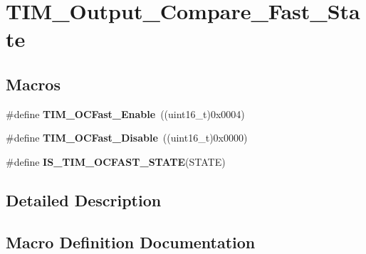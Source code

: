 \hypertarget{group___t_i_m___output___compare___fast___state}{}\section{T\+I\+M\+\_\+\+Output\+\_\+\+Compare\+\_\+\+Fast\+\_\+\+State}
\label{group___t_i_m___output___compare___fast___state}
\subsection*{Macros}
\begin{DoxyCompactItemize}
\item 
\#define {\bfseries T\+I\+M\+\_\+\+O\+C\+Fast\+\_\+\+Enable}~((uint16\+\_\+t)0x0004)\hypertarget{group___t_i_m___output___compare___fast___state_ga0cfb598c985363ee7004e52c97c524a3}{}\label{group___t_i_m___output___compare___fast___state_ga0cfb598c985363ee7004e52c97c524a3}

\item 
\#define {\bfseries T\+I\+M\+\_\+\+O\+C\+Fast\+\_\+\+Disable}~((uint16\+\_\+t)0x0000)\hypertarget{group___t_i_m___output___compare___fast___state_gab3d39f8797953cb58754205169d8278e}{}\label{group___t_i_m___output___compare___fast___state_gab3d39f8797953cb58754205169d8278e}

\item 
\#define {\bfseries I\+S\+\_\+\+T\+I\+M\+\_\+\+O\+C\+F\+A\+S\+T\+\_\+\+S\+T\+A\+TE}(S\+T\+A\+TE)
\end{DoxyCompactItemize}


\subsection{Detailed Description}


\subsection{Macro Definition Documentation}
